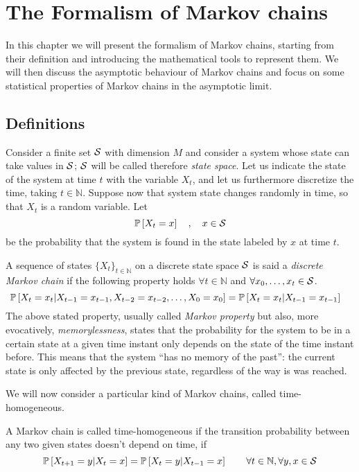 \chapter{The Formalism of Markov chains}
In this chapter we will present the formalism of Markov chains, starting from their definition and introducing the mathematical tools to represent them. We will then discuss the asymptotic behaviour of Markov chains and focus on some statistical properties of Markov chains in the asymptotic limit.
\label{ch:markov_chains}
\section{Definitions}
Consider a finite set $\mathcal{S}$ with dimension $M$ and consider a system whose state can take values in $\mathcal{S}$; $\mathcal{S}$ will be called therefore \emph{state space}. Let us indicate the state of the system at time $t$ with the variable $X_t$, and let us furthermore discretize the time, taking $t \in \mathbb{N}$. Suppose now that system state changes randomly in time, so that $X_t$ is a random variable. Let
\begin{equation}
    \mathbb{P}\left[X_t = x\right] \quad , \quad x \in \mathcal{S}
\end{equation}
be the probability that the system is found in the state labeled by $x$ at time $t$.

\begin{ndef}  \label{def:markov-chain}
    A sequence of states $\{X_t\}_{t\in \mathbb{N}}$ on a discrete state space $\mathcal{S}$ is said a \emph{discrete Markov chain} if the following property holds $\forall t \in \mathbb N$ and $\forall x_0, \dots, x_t \in \mathcal{S}$.
    \begin{equation}
        \mathbb{P}\left[ X_t = x_t | X_{t-1} = x_{t-1}, X_{t-2} = x_{t-2}, \dots, X_0 = x_0 \right] = \mathbb{P}\left[ X_t = x_t | X_{t-1} = x_{t-1} \right] \quad
    \end{equation}
The above stated property, usually called \emph{Markov property} but also, more evocatively, \emph{memorylessness}, states that the probability for the system to be in a certain state at a given time instant only depends on the state of the time instant before. This means that the system \enquote{has no memory of the past}: the current state is only affected by the previous state, regardless of the way is was reached.
\end{ndef}

We will now consider a particular kind of Markov chains, called time-homogeneous.
\begin{ndef}  A Markov chain is called time-homogeneous if the transition probability between any two given states doesn't depend on time, \ie if
    \begin{equation}
        \mathbb{P}\left[X_{t+1} = y | X_{t} = x\right] = \mathbb{P}\left[X_{t} = y | X_{t-1} = x\right] \quad \quad \forall t\in \mathbb{N}, \forall y, x \in \mathcal{S}
    \end{equation}
\end{ndef}

